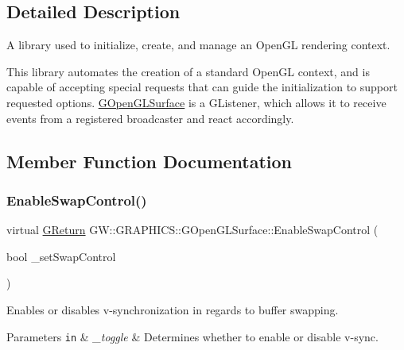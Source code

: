 \subsection{Detailed Description}
A library used to initialize, create, and manage an Open\+GL rendering context. 

This library automates the creation of a standard Open\+GL context, and is capable of accepting special requests that can guide the initialization to support requested options. \hyperlink{classGW_1_1GRAPHICS_1_1GOpenGLSurface}{G\+Open\+G\+L\+Surface} is a G\+Listener, which allows it to receive events from a registered broadcaster and react accordingly. 

\subsection{Member Function Documentation}
\mbox{\label{classGW_1_1GRAPHICS_1_1GOpenGLSurface_a1a4d3e9f9e183a4987bf13187d802e66}} 
\subsubsection{\texorpdfstring{Enable\+Swap\+Control()}{EnableSwapControl()}}
{\footnotesize\ttfamily virtual \hyperlink{namespaceGW_a67a839e3df7ea8a5c5686613a7a3de21}{G\+Return} G\+W\+::\+G\+R\+A\+P\+H\+I\+C\+S\+::\+G\+Open\+G\+L\+Surface\+::\+Enable\+Swap\+Control (\begin{DoxyParamCaption}\item[{bool}]{\+\_\+set\+Swap\+Control }\end{DoxyParamCaption})\hspace{0.3cm}{\ttfamily [pure virtual]}}



Enables or disables v-\/synchronization in regards to buffer swapping. 


\begin{DoxyParams}[1]{Parameters}
\mbox{\tt in}  & {\em \+\_\+toggle} & Determines whether to enable or disable v-\/sync.\\
\hline
\end{DoxyParams}

